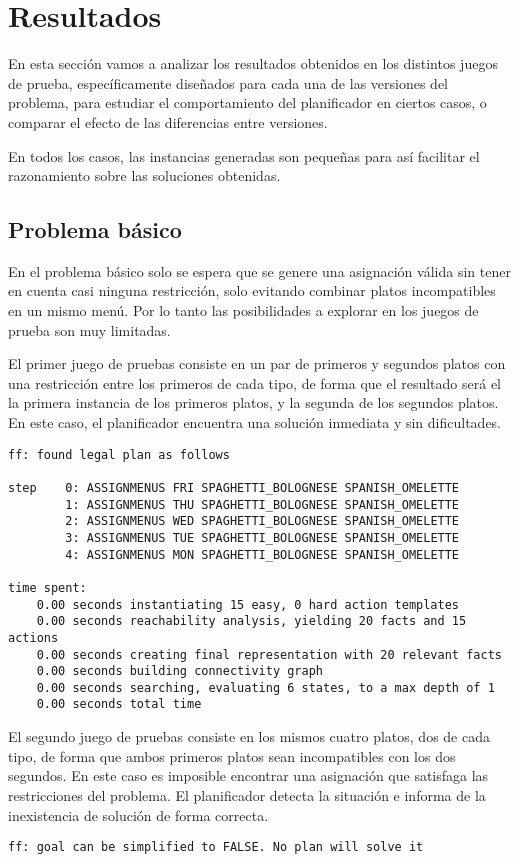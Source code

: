 \documentclass{article}
\begin{document}
\section{Resultados}
En esta sección vamos a analizar los resultados obtenidos en los distintos juegos de prueba, específicamente diseñados para cada una de las versiones del problema, para estudiar el comportamiento del planificador en ciertos casos, o comparar el efecto de las diferencias entre versiones.
\par
En todos los casos, las instancias generadas son pequeñas para así facilitar el razonamiento sobre las soluciones obtenidas.

\subsection{Problema básico}
En el problema básico solo se espera que se genere una asignación válida sin tener en cuenta casi ninguna restricción, solo evitando combinar platos incompatibles en un mismo menú. Por lo tanto las posibilidades a explorar en los juegos de prueba son muy limitadas.
\par
El primer juego de pruebas consiste en un par de primeros y segundos platos con una restricción entre los primeros de cada tipo, de forma que el resultado será el la primera instancia de los primeros platos, y la segunda de los segundos platos. En este caso, el planificador encuentra una solución inmediata y sin dificultades.
\begin{lstlisting}[language=none]
ff: found legal plan as follows

step    0: ASSIGNMENUS FRI SPAGHETTI_BOLOGNESE SPANISH_OMELETTE
        1: ASSIGNMENUS THU SPAGHETTI_BOLOGNESE SPANISH_OMELETTE
        2: ASSIGNMENUS WED SPAGHETTI_BOLOGNESE SPANISH_OMELETTE
        3: ASSIGNMENUS TUE SPAGHETTI_BOLOGNESE SPANISH_OMELETTE
        4: ASSIGNMENUS MON SPAGHETTI_BOLOGNESE SPANISH_OMELETTE

time spent:
    0.00 seconds instantiating 15 easy, 0 hard action templates
    0.00 seconds reachability analysis, yielding 20 facts and 15 actions
    0.00 seconds creating final representation with 20 relevant facts
    0.00 seconds building connectivity graph
    0.00 seconds searching, evaluating 6 states, to a max depth of 1
    0.00 seconds total time
\end{lstlisting}
El segundo juego de pruebas consiste en los mismos cuatro platos, dos de cada tipo, de forma que ambos primeros platos sean incompatibles con los dos segundos. En este caso es imposible encontrar una asignación que satisfaga las restricciones del problema. El planificador detecta la situación e informa de la inexistencia de solución de forma correcta.
\begin{lstlisting}[language=none]
ff: goal can be simplified to FALSE. No plan will solve it
\end{lstlisting}
\end{document}
